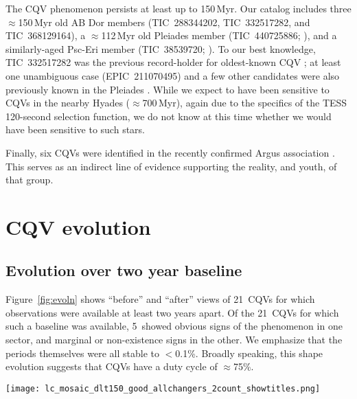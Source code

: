 \documentclass[11pt,twocolumn,tighten]{aastex63}
\newcommand{\ntwoyear}{21} %
\newcommand{\ntwoyearturnedoff}{5} %
\begin{document}
The CQV phenomenon persists at least up to 150\,Myr.  Our catalog
includes three $\approx$150\,Myr old AB Dor members (TIC~288344202,
TIC~332517282, and TIC~368129164), a $\approx$112\,Myr old Pleiades
member (TIC~440725886; \citealt{CantatGaudin_2020}), and a
similarly-aged Psc-Eri member (TIC~38539720;
\citealt{2020A&A...639A..64R}).  To our best knowledge, TIC~332517282
was the previous record-holder for oldest-known CQV
\citep{2019ApJ...876..127Z,2022AJ....163..144G}; at least one
unambiguous case (EPIC~211070495) and a few other candidates were also
previously known in the Pleiades \citep{2016AJ....152..114R}.  While
we expect to have been sensitive to CQVs in the nearby Hyades
($\approx$700\,Myr), again due to the specifics of the TESS 120-second
selection function, we do not know at this time whether we would have
been sensitive to such stars.

Finally, six CQVs were identified in the recently confirmed Argus
association \citep{2019ApJ...870...27Z}.  This serves as an indirect
line of evidence supporting the reality, and youth, of that group.


\section{CQV evolution}

\subsection{Evolution over two year baseline}

Figure~\ref{fig:evoln} shows ``before'' and ``after'' views
of \ntwoyear\ CQVs for which observations were available at least two years
apart.
Of the \ntwoyear\ CQVs for which such a baseline was available,
\ntwoyearturnedoff\ showed obvious signs of the phenomenon in one sector,
and marginal or non-existence signs in the other.
We emphasize that the periods themselves were all stable to $<$0.1\%.
Broadly speaking, this shape evolution
suggests that CQVs have a duty cycle of $\approx$75\%.


\begin{figure*}[!t]
	\begin{center}
		\centering
		\texttt{[image: lc\_mosaic\_dlt150\_good\_allchangers\_2count\_showtitles.png]}
		\vspace{-0.2cm}
		\caption{
			{\bf Evolution of CQVs}: ``Before and
			after'...  Panels
			in the top two rows are separated by two years
			($\approx$$10^3$ cycles); each panel shows one month.
			Periods are listed in hours. 
			{\bf todo: fix the plot and the caption.}
		}
		\label{fig:evoln}
	\end{center}
\end{figure*}
\end{document}
